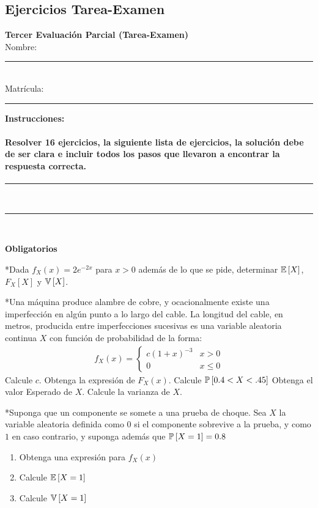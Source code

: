 \subsection{Ejercicios Tarea-Examen}
\begin{center}
    {\Large \textbf{Tercer Evaluaci\'on Parcial (Tarea-Examen)}} \\[0.3cm]
    Nombre: \rule{10cm}{0.4pt} \\[0.3cm]
    Matrícula: \rule{5cm}{0.4pt}
\end{center}


\textbf{Instrucciones:}

\paragraph{
Resolver 16 ejercicios,  la siguiente lista de ejercicios, la soluci\'on debe de ser clara e incluir todos los pasos que llevaron a encontrar la respuesta correcta.}
\begin{center}
\rule{15cm}{0.4pt} \\[0.2cm]
\rule{15cm}{0.4pt} \\[0.2cm]
\end{center}
\textbf{Obligatorios}

\begin{Quest} *Dada $f_{X}\left(x\right)=2e^{-2x}$ para $x>0$ además de lo que se pide, determinar $\mathbb{E}\left[X\right]$, $F_{X}\left[X\right]$ y $\mathbb{V}\left[X\right]$.
\end{Quest}

\begin{Quest}*Una máquina produce alambre de cobre, y ocacionalmente existe una imperfección en algún punto a lo largo del cable. La longitud del cable, en metros, producida entre imperfecciones sucesivas es una variable aleatoria continua $X$ con función de probabilidad de la forma:
\begin{eqnarray*}
f_{X}\left(x\right)= \left\{ \begin{array}{ll}
c\left(1+x\right)^{-3} & x>0\\
0 & x\leq0
\end{array} \right.
\end{eqnarray*}
Calcule $c$. Obtenga la expresión de $F_{X}\left(x\right)$. Calcule  $\mathbb{P}\left[0.4<X<.45\right]$ Obtenga el valor Esperado de $X$. Calcule la varianza de $X$.
\end{Quest}

\begin{Quest}
*Suponga que un componente se somete a una prueba de choque. Sea $X$ la variable aleatoria definida como $0$ si el componente sobrevive a la prueba, y como $1$ en caso contrario, y suponga además que $\mathbb{P}\left[X=1\right]=0.8$
\begin{enumerate}
\item Obtenga una expresión para $f_{X}\left(x\right)$
\item Calcule $\mathbb{E}\left[X=1\right]$
\item Calcule $\mathbb{V}\left[X=1\right]$
\end{enumerate}
\end{Quest}

